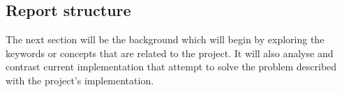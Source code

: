 \documentclass[11pt]{informatics-report}
\begin{document}
\subsection{Report structure}
The next section will be the background which will begin by exploring the keywords or concepts that are related to the project.
It will also analyse and contrast current implementation that attempt to solve the problem described with the project's implementation.












\appendix



\end{document}
